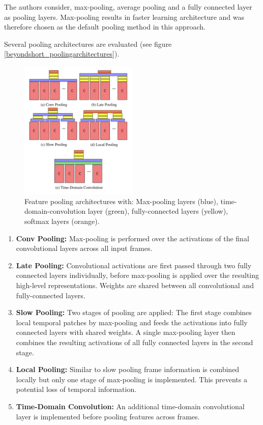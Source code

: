 The authors consider, max-pooling, average pooling and a fully connected layer as pooling layers. Max-pooling results in faster learning architecture and was therefore chosen as the default pooling method in this approach. 

Several pooling architectures are evaluated (see figure \ref{beyondshort_poolingarchitectures}).

\begin{figure}[H]
    \centering
    \includegraphics[width=0.5\textwidth]{img_deep/beyondshort_poolingarchitectures}
    \caption{Feature pooling architectures with: Max-pooling layers (blue), time-domain-convolution layer (green), fully-connected layers (yellow), softmax layers (orange). \cite{ng_beyond_2015}}
    \label{fig:beyondshort_poolingarchitectures}
\end{figure}

\begin{enumerate}[label=\alph*)]
    \item \textbf{Conv Pooling:} Max-pooling is performed over the activations of the final convolutional layers across all input frames.
    \item \textbf{Late Pooling:} Convolutional activations are first passed through two fully connected layers individually, before max-pooling is applied over the resulting high-level representations. Weights are shared between all convolutional and fully-connected layers.
    \item \textbf{Slow Pooling:} Two stages of pooling are applied: The first stage combines local temporal patches by max-pooling and feeds the activations into fully connected layers with shared weights. A single max-pooling layer then combines the resulting activations of all fully connected layers in the second stage.
    \item \textbf{Local Pooling:} Similar to slow pooling frame information is combined locally but only one stage of max-pooling is implemented. This prevents a potential loss of temporal information.
    \item \textbf{Time-Domain Convolution:} An additional time-domain convolutional layer is implemented before pooling features across frames.
\end{enumerate}

